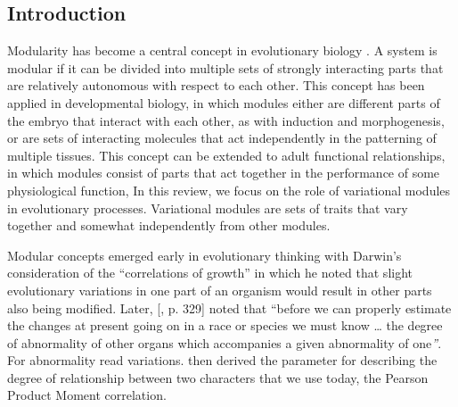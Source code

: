 \begin{refsection}

\section{Introduction}

Modularity has become a central concept in evolutionary biology
\parencite{Wagner2007-cx}. A system is
modular if it can be divided into multiple sets of strongly interacting
parts that are relatively autonomous with respect to each other. This
concept has been applied in developmental biology, in which modules
either are different parts of the embryo that interact with each other,
as with induction and morphogenesis, or are sets of interacting
molecules that act independently in the patterning of multiple tissues.
This concept can be extended to adult functional relationships, in which
modules consist of parts that act together in the performance of some
physiological function, In this review, we focus on the role of
variational modules in evolutionary processes. Variational modules are
sets of traits that vary together and somewhat independently from other
modules.

Modular concepts emerged early in evolutionary thinking with Darwin's
consideration of the ``correlations of growth'' in which he noted that
slight evolutionary variations in one part of an organism would result
in other parts also being modified. Later, [\textcite{Weldon1894-rk}, p. 329]
 noted that
``before we can properly estimate the changes at present going on in a
race or species we must know \ldots{} the degree of abnormality of other
organs which accompanies a given abnormality of one\emph{''}. For
abnormality read variations. \textcite{Pearson1896-va}
 then derived the parameter for describing the degree of
relationship between two characters that we use today, the Pearson
Product Moment correlation.


\end{refsection}
